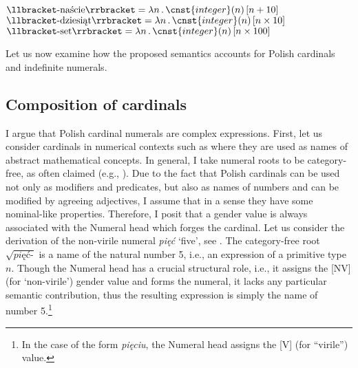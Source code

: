 \documentclass[output=paper,
]{langscibook}
\begin{document}
	\ea \label{ex:cardinal-suffixes-semantics} \ea $\llbracket \text{-naście}\rrbracket = \lambda n\,.\,\cnst{integer}(n)\,[n+10]$\label{ex:cardinal-suffixes-teen}
\ex $\llbracket \text{-dziesiąt}\rrbracket = \lambda n\,.\,\cnst{integer}(n)\,[n\times 10]$\label{ex:cardinal-suffixes-ty}
\ex $\llbracket \text{-set}\rrbracket = \lambda n\,.\,\cnst{integer}(n)\,[n\times 100]$\label{ex:cardinal-suffixes-hundred}
	\z
    \z

\begin{multicols}{2}
	\ea \label{ex:cardinal-suffixes-integers} \columnbreak
	\z
    \z
\end{multicols}

\noindent Let us now examine how the proposed semantics accounts for Polish cardinals and indefinite numerals. 
	
	\subsection{Composition of cardinals}\label{sec:composition-of-cardinals}

\largerpage[2]
I argue that Polish cardinal numerals are complex expressions. First, let us consider cardinals in numerical contexts such as  where they are used as names of abstract mathematical concepts. In general, I take numeral roots to be category-free, as often claimed (e.g., \citealt{halle_marantz1993distributed}). Due to the fact that Polish cardinals can be used not only as modifiers and predicates, but also as names of numbers and can be modified by agreeing adjectives, I assume that in a sense they have some nominal-like properties. Therefore, I posit that a gender value is always associated with the Numeral head which forges the cardinal. Let us consider the derivation of the non-virile numeral \textit{pięć} `five', see . The category-free root $\sqrt{\textit{pięć-}}$ is a name of the natural number 5, i.e., an expression of a primitive type $n$. Though the Numeral head has a crucial structural role, i.e., it assigns the [NV] (for `non-virile') gender value and forms the numeral, it lacks any particular semantic contribution, thus the resulting expression is simply the name of number 5.\footnote{In the case of the form \textit{pięciu}, the Numeral head assigns the [V] (for ``virile'') value.}
\end{document}
